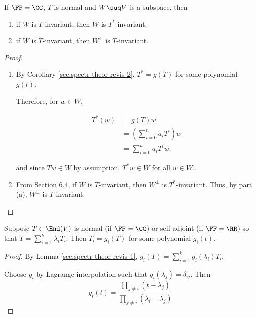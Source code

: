 \documentclass[11pt]{scrartcl}
\begin{document}
  \begin{corollary}
    If $\FF = \CC$, $T$ is normal and $W\suq V$ is a subspace, then
    \begin{enumerate}[label=\alph*)]
    \item if $W$ is $T$-invariant, then $W$ is $T^{*}$-invariant.
    \item if $W$ is $T$-invariant, then $W^{\bot}$ is $T$-invariant.
    \end{enumerate}
  \end{corollary}
  \begin{proof}
    \hfill
    \begin{enumerate}[label=\alph*)]
    \item     By Corollary \ref{sec:spectr-theor-revis-2}, $T^{*} = g(T)$ for some polynomial $g(t)$.

    Therefore, for $w\in W$,

    \begin{align}
      T^{*}(w) & = g(T)w                 \\
               & = (\sum_{i=0}^na_iT^i)w \\
               & = \sum_{i=0}^na_iT^iw,
    \end{align}

    and since $Tw\in W$ by assumption, $T^{*}w \in W$ for all $w\in W$..
  \item From Section 6.4,  if $W$ is $T$-invariant, then $W^{\bot}$ is $T^{*}$-invariant. Thus, by part (a), $W^{\bot}$ is $T$-invariant.
    \end{enumerate}
  \end{proof}

  \begin{corollary}

    Suppose $T \in \End(V)$ is normal (if $\FF = \CC$) or self-adjoint
    (if $\FF = \RR$) so that $T = \sum_{i=1}^k\lambda_iT_i$.
    Then $T_i = g_i(T)$ for some polynomial $g_i(t)$.
  \end{corollary}
  \begin{proof}
    \hfill

    By Lemma \ref{sec:spectr-theor-revis-1}, $g_i(T) = \sum_{i=1}^kg_i(\lambda_i)T_i$.

    Choose $g_i$ by Lagrange interpolation such that $g_i(\lambda_j) = \delta_{ij}$. Then
    \begin{equation}
      g_i(t) = \frac{\prod_{j\neq i}(t-\lambda_j)}{\prod_{j\neq i}(\lambda_i-\lambda_j)}
    \end{equation}
  \end{proof}
\end{document}
